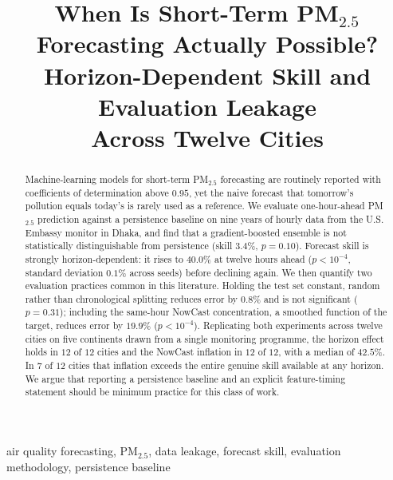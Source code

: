 \documentclass[conference,a4paper]{IEEEtran}
\begin{document}
\title{When Is Short-Term PM$_{2.5}$ Forecasting Actually Possible?\\
Horizon-Dependent Skill and Evaluation Leakage\\
Across Twelve Cities}

\author{
}

\maketitle

\begin{abstract}
Machine-learning models for short-term PM$_{2.5}$ forecasting are routinely
reported with coefficients of determination above $0.95$, yet the naive forecast
that tomorrow's pollution equals today's is rarely used as a reference. We
evaluate one-hour-ahead PM$_{2.5}$ prediction against a persistence baseline on
nine years of hourly data from the U.S. Embassy monitor in Dhaka, and find that a
gradient-boosted ensemble is not statistically distinguishable from persistence
(skill $3.4\%$, $p=0.10$). Forecast skill is strongly horizon-dependent: it rises
to $40.0\%$ at twelve hours ahead ($p<10^{-4}$, standard deviation $0.1\%$ across
seeds) before declining again. We then quantify two evaluation practices common
in this literature. Holding the test set constant, random rather than
chronological splitting reduces error by $0.8\%$ and is not significant
($p=0.31$); including the same-hour NowCast concentration, a smoothed function of
the target, reduces error by $19.9\%$ ($p<10^{-4}$). Replicating both experiments
across twelve cities on five continents drawn from a single monitoring programme,
the horizon effect holds in $12$ of $12$ cities and the NowCast inflation in $12$
of $12$, with a median of $42.5\%$. In $7$ of $12$ cities that inflation exceeds
the entire genuine skill available at any horizon. We argue that reporting a
persistence baseline and an explicit feature-timing statement should be minimum
practice for this class of work.
\end{abstract}

\begin{IEEEkeywords}
air quality forecasting, PM$_{2.5}$, data leakage, forecast skill, evaluation
methodology, persistence baseline
\end{IEEEkeywords}
\end{document}
